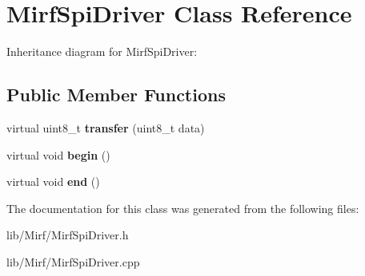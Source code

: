 \hypertarget{class_mirf_spi_driver}{}\section{Mirf\+Spi\+Driver Class Reference}
\label{class_mirf_spi_driver}


Inheritance diagram for Mirf\+Spi\+Driver\+:
\subsection*{Public Member Functions}
\begin{DoxyCompactItemize}
\item 
\mbox{\label{class_mirf_spi_driver_af8e39256017b2bfcb3a19c8fd0e1b512}} 
virtual uint8\+\_\+t {\bfseries transfer} (uint8\+\_\+t data)
\item 
\mbox{\label{class_mirf_spi_driver_a9d661feba1677cdcfc63175af3f7e99d}} 
virtual void {\bfseries begin} ()
\item 
\mbox{\label{class_mirf_spi_driver_a9320ce0b9d34cd7c4a96ea5d5a38dc90}} 
virtual void {\bfseries end} ()
\end{DoxyCompactItemize}


The documentation for this class was generated from the following files\+:\begin{DoxyCompactItemize}
\item 
lib/\+Mirf/Mirf\+Spi\+Driver.\+h\item 
lib/\+Mirf/Mirf\+Spi\+Driver.\+cpp\end{DoxyCompactItemize}
